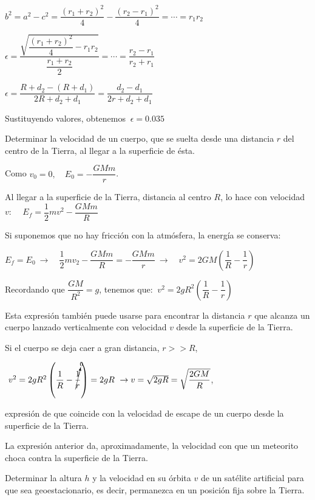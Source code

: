  $b^2=a^2-c^2=\dfrac{(r_1+r_2)^2}{4}-\dfrac{(r_2-r_1)^2}{4}=\cdots=r_1r_2$
 
 $\epsilon=\dfrac{\sqrt{\dfrac{(r_1+r_2)^2}{4}-r_1r_2}}{\dfrac{r_1+r_2}{2}}=\cdots=\dfrac{r_2-r_1}{r_2+r_1}$
 
 $\epsilon= \dfrac{R+d_2-(R+d_1)}{2R+d_2+d_1}=\dfrac{d_2-d_1}{2r+d_2+d_1}$
 
 Sustituyendo valores, obtenemos $\ \epsilon=0.035$

\begin{prob}
Determinar la velocidad de un cuerpo, que se suelta desde una distancia $r$ del centro de la Tierra, al llegar a la superficie de ésta.	
\end{prob}
Como $v_0=0, \quad E_0=-\dfrac{GMm}{r}$. 

Al llegar a la superficie de la Tierra, distancia al centro $R$, lo hace con velocidad $v$:
$\quad E_f=\dfrac 1 2 m v^2-\dfrac{GMm}{R}$

Si suponemos que no hay fricción con la atmósfera, la energía se conserva:

$E_f=E_0 \ \to \quad \dfrac 1 2 m v_2-\dfrac{GMm}{R}=-\dfrac{GMm}{r} \ \to \quad v^2=2GM\left( \dfrac 1 R - \dfrac 1 r \right)$

Recordando que $\dfrac{GM}{R^2}=g$, tenemos que: $\ v^2=2gR^2\left( \dfrac 1 R - \dfrac 1 r \right)$

Esta expresión también puede usarse para encontrar la distancia $r$ que alcanza un cuerpo lanzado verticalmente con velocidad $v$ desde la superficie de la Tierra.

Si el cuerpo se deja caer a gran distancia, $r>>R$, 

$\ v^2=2gR^2\left( \dfrac 1 R - \cancelto{0}{\dfrac 1 r} \right)=2gR\ \to v=\sqrt{2gR}=\sqrt{\dfrac{2GM}{R}}$,

expresión de que coincide con la velocidad de escape de un cuerpo desde la superficie de la Tierra.

La expresión anterior da, aproximadamente, la velocidad con que un meteorito choca contra la superficie de la Tierra.

\vspace{15mm} %
\begin{prob}
Determinar la altura $h$	 y la velocidad en su órbita $v$ de un satélite artificial para que sea geoestacionario, es decir, permanezca en un posición fija sobre la Tierra.
\end{prob}

